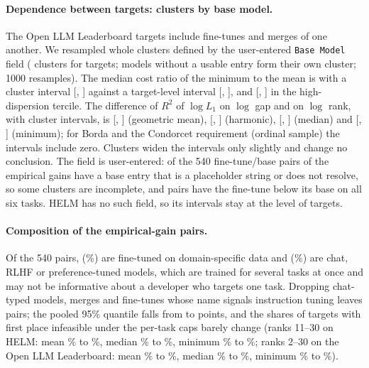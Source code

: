 \paragraph{Dependence between targets: clusters by base model.} The Open LLM Leaderboard targets include fine-tunes and merges of one another. We resampled whole clusters defined by the user-entered \texttt{Base Model} field (\cbClusters{} clusters for \cbTargets{} targets; models without a usable entry form their own cluster; 1000 resamples). The median cost ratio of the minimum to the mean is \cbRatio{} with a cluster interval [\cbRatioLo, \cbRatioHi] against a target-level interval [\cbRatioIidLo, \cbRatioIidHi], and \cbRatioHigh{} [\cbRatioHighLo, \cbRatioHighHi] in the high-dispersion tercile. The difference of $R^2$ of $\log L_1$ on $\log$ gap and on $\log$ rank, with cluster intervals, is \cbDiffGeomean{} [\cbDiffGeomeanLo, \cbDiffGeomeanHi] (geometric mean), \cbDiffHarmonic{} [\cbDiffHarmonicLo, \cbDiffHarmonicHi] (harmonic), \cbDiffMedian{} [\cbDiffMedianLo, \cbDiffMedianHi] (median) and \cbDiffMin{} [\cbDiffMinLo, \cbDiffMinHi] (minimum); for Borda and the Condorcet requirement (ordinal sample) the intervals include zero. Clusters widen the intervals only slightly and change no conclusion. The field is user-entered: \bmPlaceholder{} of the 540 fine-tune/base pairs of the empirical gains have a base entry that is a placeholder string or does not resolve, so some clusters are incomplete, and \bmSuspect{} pairs have the fine-tune below its base on all six tasks. HELM has no such field, so its intervals stay at the level of targets.

\paragraph{Composition of the empirical-gain pairs.} Of the 540 pairs, \pairDomain{} (\pairDomainShare\%) are fine-tuned on domain-specific data and \pairChat{} (\pairChatShare\%) are chat, RLHF or preference-tuned models, which are trained for several tasks at once and may not be informative about a developer who targets one task. Dropping chat-typed models, merges and fine-tunes whose name signals instruction tuning leaves \pairRestrictedN{} pairs; the pooled 95\% quantile falls from \empPooled{} to \empPooledRestricted{} points, and the shares of targets with first place infeasible under the per-task caps barely change (ranks 11--30 on HELM: mean \rpHelmMeanA\% to \rpHelmMeanR\%, median \rpHelmMedianA\% to \rpHelmMedianR\%, minimum \rpHelmMinA\% to \rpHelmMinR\%; ranks 2--30 on the Open LLM Leaderboard: mean \rpOllbMeanA\% to \rpOllbMeanR\%, median \rpOllbMedianA\% to \rpOllbMedianR\%, minimum \rpOllbMinA\% to \rpOllbMinR\%).

